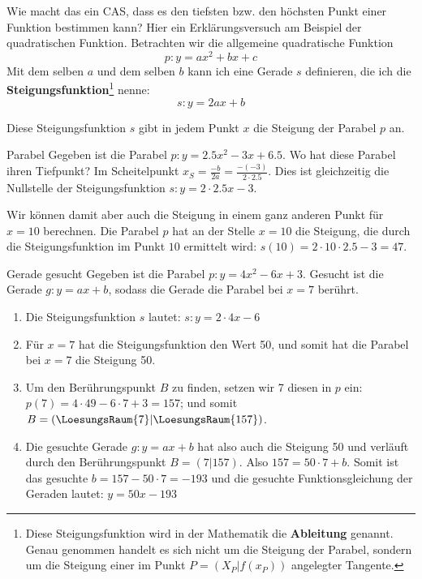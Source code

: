 Wie macht das ein CAS, dass es den tiefsten bzw. den höchsten Punkt
einer Funktion bestimmen kann? Hier ein Erklärungsversuch am Beispiel
der quadratischen Funktion.
Betrachten wir die allgemeine quadratische Funktion $$p: y=ax^2 + bx +
c$$
Mit dem selben $a$ und dem selben $b$ kann ich eine Gerade $s$
definieren, die ich die \textbf{Steigungsfunktion}\footnote{Diese
  Steigungsfunktion wird in der Mathematik die
  \textbf{Ableitung} genannt. Genau genommen handelt
  es sich nicht um die Steigung der Parabel, sondern um die Steigung
  einer im Punkt $P=(X_P|f(x_P))$ angelegter Tangente.} nenne:
$$s: y= 2ax+b$$
\newpage


Diese Steigungsfunktion $s$ gibt in jedem Punkt $x$ die Steigung der
Parabel $p$ an.

\begin{beispiel}{Parabel}{}
  Gegeben ist die Parabel $p: y=2.5x^2 - 3x + 6.5$. Wo hat diese Parabel
  ihren Tiefpunkt? Im Scheitelpunkt $x_S =
  \frac{-b}{2a} = \frac{-(-3)}{2\cdot{}2.5}$. Dies ist gleichzeitig die Nullstelle der
  Steigungsfunktion $s: y= 2\cdot{}2.5x - 3$.

  Wir können damit aber auch die Steigung in einem ganz anderen Punkt
  \zB für $x=10$ berechnen. Die Parabel $p$ hat an der Stelle $x=10$
  die Steigung, die durch die Steigungsfunktion im Punkt $10$
  ermittelt wird: $s(10) = 2\cdot{}10\cdot{2.5} - 3 = 47$.
  
\end{beispiel}

\begin{beispiel}{Gerade gesucht}{}
Gegeben ist die Parabel $p: y=4x^2 -6x + 3$. Gesucht ist die Gerade
$g: y=ax+b$, sodass die Gerade die Parabel bei $x=7$ berührt.

\begin{enumerate}
\item Die Steigungsfunktion $s$ lautet: $s: y=2\cdot{}4x - 6$
\item Für $x=7$ hat die Steigungsfunktion den Wert 50, und somit hat
  die Parabel bei $x=7$ die Steigung 50.
\item Um den Berührungspunkt $B$ zu finden, setzen wir 7 diesen in $p$
  ein: $p(7)= 4\cdot{}49-6\cdot{}7+3 = 157$; und somit $B=(\LoesungsRaum{7}|\LoesungsRaum{157})$.
\item Die gesuchte Gerade $g: y=ax+b$ hat also auch die Steigung 50
  und verläuft durch den Berührungspunkt $B=(7|157)$. Also
  $157=50\cdot{}7+b$. Somit ist das gesuchte $b = 157-50\cdot{}7=-193$
  und die gesuchte Funktionsgleichung der Geraden lautet: $y = 50x-193$
  \end{enumerate}
\end{beispiel}
\newpage


